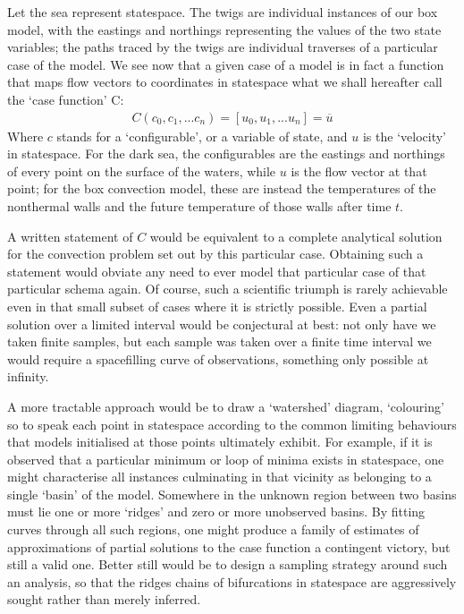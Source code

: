 \documentclass[letterpaper,10pt,english]{jupyterBook}
\begin{document}
\sphinxAtStartPar
Let the sea represent state\sphinxhyphen{}space. The twigs are individual instances of our box model, with the eastings and northings representing the values of the two state variables; the paths traced by the twigs are individual traverses of a particular case of the model. We see now that a given case of a model is in fact a function that maps flow vectors to coordinates in state\sphinxhyphen{}space \sphinxhyphen{} what we shall hereafter call the ‘case function’ C:
\begin{equation*}
\begin{split} C \left( c_0, c_1, ... c_n \right) = \left[ u_0, u_1, ... u_n \right] = \overline{u} \end{split}
\end{equation*}
\sphinxAtStartPar
Where \(c\) stands for a ‘configurable’, or a variable of state, and \(u\) is the ‘velocity’ in state\sphinxhyphen{}space. For the dark sea, the configurables are the eastings and northings of every point on the surface of the waters, while \(u\) is the flow vector at that point; for the box convection model, these are instead the temperatures of the non\sphinxhyphen{}thermal walls and the future temperature of those walls after time \(t\).

\sphinxAtStartPar
A written statement of \(C\) would be equivalent to a complete analytical solution for the convection problem set out by this particular case. Obtaining such a statement would obviate any need to ever model that particular case of that particular schema again. Of course, such a scientific triumph is rarely achievable even in that small subset of cases where it is strictly possible. Even a partial solution over a limited interval would be conjectural at best: not only have we taken finite samples, but each sample was taken over a finite time interval \sphinxhyphen{} we would require a space\sphinxhyphen{}filling curve of observations, something only possible at infinity.

\sphinxAtStartPar
A more tractable approach would be to draw a ‘watershed’ diagram, ‘colouring’ \sphinxhyphen{} so to speak \sphinxhyphen{} each point in state\sphinxhyphen{}space according to the common limiting behaviours that models initialised at those points ultimately exhibit. For example, if it is observed that a particular minimum or loop of minima exists in state\sphinxhyphen{}space, one might characterise all instances culminating in that vicinity as belonging to a single ‘basin’ of the model. Somewhere in the unknown region between two basins must lie one or more ‘ridges’ and zero or more unobserved basins. By fitting curves through all such regions, one might produce a family of estimates of approximations of partial solutions to the case function \sphinxhyphen{} a contingent victory, but still a valid one. Better still would be to design a sampling strategy around such an analysis, so that the ridges \sphinxhyphen{} chains of bifurcations in state\sphinxhyphen{}space \sphinxhyphen{} are aggressively sought rather than merely inferred.
\end{document}
